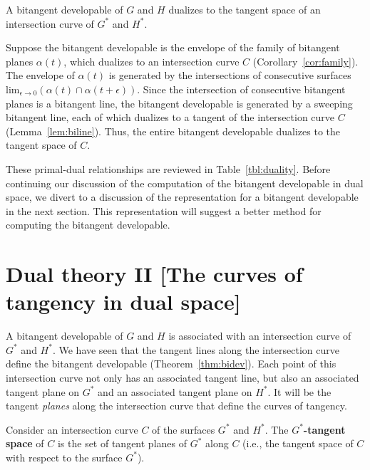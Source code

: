 \documentclass[12pt]{article}
\begin{document}

\begin{theorem}
\label{thm:bidev}
A bitangent developable of $G$ and $H$ dualizes to the tangent space of
an intersection curve of $G^*$ and $H^*$.
\end{theorem}
\prf
Suppose the bitangent developable is the envelope of the 
family of bitangent planes $\alpha(t)$,
which dualizes to an intersection curve $C$ (Corollary~\ref{cor:family}).
The envelope of $\alpha(t)$ is generated
by the intersections of consecutive surfaces 
$\mbox{lim}_{\epsilon \rightarrow 0} (\alpha(t) \cap \alpha(t + \epsilon))$.
Since the intersection of consecutive bitangent planes is a bitangent line,
the bitangent developable is generated by a sweeping bitangent line,
each of which dualizes to a tangent of the intersection curve $C$
(Lemma~\ref{lem:biline}).
Thus, the entire bitangent developable dualizes to the tangent space of $C$.
\QED

These primal-dual relationships are reviewed in Table~\ref{tbl:duality}.
Before continuing our discussion of the computation of the bitangent developable
in dual space, we divert to a discussion of the representation
for a bitangent developable in the next section.
This representation will suggest a
better method for computing the bitangent developable.

\clearpage


\section{Dual theory II [The curves of tangency in dual space]}
\label{sec:curveoftang}

A bitangent developable of $G$ and $H$ is associated with
an intersection curve of $G^*$ and $H^*$.
We have seen that the tangent lines along the intersection curve define the bitangent
developable (Theorem~\ref{thm:bidev}).
Each point of this intersection curve not only has an associated tangent line,
but also an associated tangent plane on $G^*$
and an associated tangent plane on $H^*$.
It will be the tangent {\em planes} along the intersection curve
that define the curves of tangency.

\begin{defn2}
Consider an intersection curve $C$ of the surfaces $G^*$ and $H^*$.
The {\bf $G^*$-tangent space} of $C$ is the set of tangent planes of $G^*$ along 
$C$ (i.e., the tangent space of $C$ with respect to the surface $G^*$).
\end{defn2}
\end{document}
